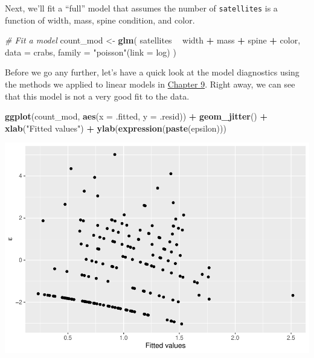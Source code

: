 \documentclass[
]{book}
\newenvironment{Shaded}{\begin{snugshade}}{\end{snugshade}}
\newcommand{\CommentTok}[1]{\textcolor[rgb]{0.56,0.35,0.01}{\textit{#1}}}
\newcommand{\DataTypeTok}[1]{\textcolor[rgb]{0.13,0.29,0.53}{#1}}
\newcommand{\KeywordTok}[1]{\textcolor[rgb]{0.13,0.29,0.53}{\textbf{#1}}}
\newcommand{\NormalTok}[1]{#1}
\newcommand{\OperatorTok}[1]{\textcolor[rgb]{0.81,0.36,0.00}{\textbf{#1}}}
\newcommand{\StringTok}[1]{\textcolor[rgb]{0.31,0.60,0.02}{#1}}
\begin{document}
Next, we'll fit a ``full'' model that assumes the number of \texttt{satellites} is a function of width, mass, spine condition, and color.

\begin{Shaded}
\begin{Highlighting}[]
\CommentTok{# Fit a model}
\NormalTok{count_mod <-}\StringTok{ }\KeywordTok{glm}\NormalTok{(}
\NormalTok{  satellites }\OperatorTok{~}\StringTok{ }\NormalTok{width }\OperatorTok{+}\StringTok{ }\NormalTok{mass }\OperatorTok{+}\StringTok{ }\NormalTok{spine }\OperatorTok{+}\StringTok{ }\NormalTok{color,}
  \DataTypeTok{data =}\NormalTok{ crabs,}
  \DataTypeTok{family =} \StringTok{"poisson"}\NormalTok{(}\DataTypeTok{link =}\NormalTok{ log)}
\NormalTok{)}
\end{Highlighting}
\end{Shaded}

Before we go any further, let's have a quick look at the model diagnostics using the methods we applied to linear models in \protect\hyperlink{Chapter9}{Chapter 9}. Right away, we can see that this model is not a very good fit to the data.

\begin{Shaded}
\begin{Highlighting}[]
\KeywordTok{ggplot}\NormalTok{(count_mod, }\KeywordTok{aes}\NormalTok{(}\DataTypeTok{x =}\NormalTok{ .fitted, }\DataTypeTok{y =}\NormalTok{ .resid)) }\OperatorTok{+}
\StringTok{  }\KeywordTok{geom_jitter}\NormalTok{() }\OperatorTok{+}
\StringTok{  }\KeywordTok{xlab}\NormalTok{(}\StringTok{"Fitted values"}\NormalTok{) }\OperatorTok{+}
\StringTok{  }\KeywordTok{ylab}\NormalTok{(}\KeywordTok{expression}\NormalTok{(}\KeywordTok{paste}\NormalTok{(epsilon)))}
\end{Highlighting}
\end{Shaded}

\includegraphics{worstr_files/figure-latex/unnamed-chunk-349-1.pdf}
\end{document}
